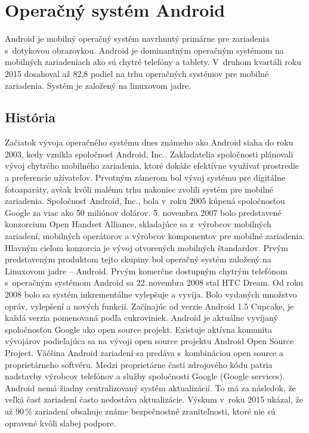\chapter{Operačný systém Android}
Android je mobilný operačný systém navrhnutý primárne pre zariadenia s~dotykovou obrazovkou. Android je dominantným operačným systémom na mobilných zariadeniach ako sú chytré telefóny a tablety. V~druhom kvartáli roku 2015 dosahoval až 82,8 podiel na trhu operačných systémov pre mobilné zariadenia. Systém je založený na linuxovom jadre. 


\section{História}
Začiatok vývoja operačného systému dnes známeho ako Android siaha do roku 2003, kedy vznikla spoločnosť Android, Inc.. Zakladatelia spoločnosti plánovali vývoj chytrého mobilného zariadenia, ktoré dokáže efektívne využívať prostredie a preferencie užívateľov. Prvotným zámerom bol vývoj systému pre digitálne fotoaparáty, avšak kvôli malému trhu nakoniec zvolili systém pre mobilné zariadenia. Spoločnosť Android, Inc., bola v~roku 2005 kúpená spoločnosťou Google za viac ako 50 miliónov dolárov. 5. novembra 2007 bolo predstavené konzorcium Open Handset Alliance, skladajúce sa z~výrobcov mobilných zariadení, mobilných operátorov a výrobcov komponentov pre mobilné zariadenia. Hlavným cieľom konzorcia je vývoj otvorených mobilných štandardov. Prvým predstaveným produktom tejto skupiny bol operačný systém založený na Linuxovom jadre – Android. Prvým komerčne dostupným chytrým telefónom s~operačným systémom Android sa 22.\,novembra 2008 stal HTC Dream. Od roku 2008 bolo sa systém inkrementálne vylepšuje a vyvíja. Bolo vydaných množstvo opráv, vylepšení a nových funkcií. Začínajúc od verzie Android 1.5 Cupcake, je každá verzia pomenovaná podľa cukroviniek.
Android je aktuálne vyvíjaný spoločnosťou Google ako open source projekt. Existuje aktívna komunita vývojárov podieľajúca sa na vývoji open source projektu Android Open Source Project. Väčšina Android zariadení sa predáva s~kombináciou open source a proprietárneho softvéru. Medzi proprietárne časti zdrojového kódu patria nadstavby výrobcov telefónov a služby spoločnosti Google (Google services). Android nemá žiadny centralizovaný systém aktualizácií. To má za následok, že veľká časť zariadení často nedostáva aktualizácie. Výskum v~roku 2015 ukázal, že až 90\,\% zariadení obsahuje známe bezpečnostné zraniteľnosti, ktoré nie sú opravené kvôli slabej podpore.
